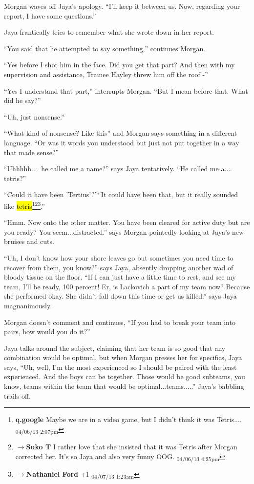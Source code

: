 Morgan waves off Jaya's apology. ``I'll keep it between us.  Now, regarding your report, I have some questions.''

Jaya frantically tries to remember what she wrote down in her report.

``You said that he attempted to say something,'' continues Morgan.

``Yes before I shot him in the face.  Did you get that part?  And then with my supervision and assistance, Trainee Hayley threw him off the roof -''

``Yes I understand that part,'' interrupts Morgan.  ``But I mean before that.  What did he say?''

``Uh, just nonsense.''

``What kind of nonsense?  Like this'' and Morgan says something in a different language. ``Or was it words you understood but just not put together in a way that made sense?''

``Uhhhhh.... he called me a name?'' says Jaya tentatively.  ``He called me a.... tetris?''

``Could it have been 'Tertius'?''``It could have been that, but it really sounded like \hl{tetris}\footnote{\textbf{q.google }Maybe we are in a video game, but I didn't think it was Tetris.... \textsubscript{04/06/13 2:07pm}}\footnote{$\rightarrow$\textbf{Suko T }I rather love that she insisted that it was Tetris after Morgan corrected her.  It's so Jaya and also very funny OOG. \textsubscript{04/06/13 4:25pm}}\footnote{$\rightarrow$\textbf{Nathaniel Ford }+1 \textsubscript{04/07/13 1:23am}}.''

``Hmm.  Now onto the other matter.  You have been cleared for active duty but are you ready?  You seem...distracted.'' says Morgan pointedly looking at Jaya's new bruises and cuts.

``Uh, I don't know how your shore leaves go but sometimes you need time to recover from them, you know?'' says Jaya, absently dropping another wad of bloody tissue on the floor.  ``If I can just have a little time to rest, and see my team, I'll be ready, 100 percent!  Er, is Lackovich a part of my team now?  Because she performed okay.  She didn't fall down this time or get us killed.'' says Jaya magnanimously.

Morgan doesn't comment and continues, ``If you had to break your team into pairs, how would you do it?''

Jaya talks around the subject, claiming that her team is so good that any combination would be optimal, but when Morgan presses her for specifics, Jaya says, ``Uh, well, I'm the most experienced so I should be paired with the least experienced.  And the boys can be together.  Those would be good subteams, you know, teams within the team that would be optimal...teams.....''  Jaya's babbling trails off.


